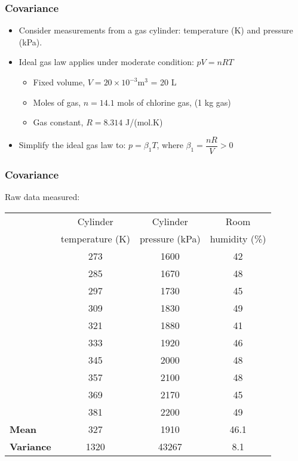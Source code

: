 \begin{frame}\frametitle{Covariance}
	\begin{itemize}
		\item	Consider measurements from a gas cylinder: temperature (K) and pressure (kPa).
		\item	Ideal gas law applies under moderate condition: $pV = nRT$
		\begin{itemize}
			\item	Fixed volume, $V = 20 \times 10^{-3} \text{m}^3$ = 20 L
			\item	Moles of gas, $n = 14.1$ mols of chlorine gas, (1 kg gas)
			\item	Gas constant, $R = 8.314$ J/(mol.K)
		\end{itemize}
	\end{itemize}
	\begin{itemize}
		\item	Simplify the ideal gas law to: $p=\beta_1 T$, where $\beta_1 = \dfrac{nR}{V} > 0$
	\end{itemize}
\end{frame}

\begin{frame}\frametitle{Covariance}

	Raw data measured:
	\begin{table}
		[ht] \centering
		\begin{tabular}
			{l c c c} \hline\hline &Cylinder & Cylinder & Room \\
			[0.5ex] &temperature (K) & pressure (kPa) & humidity (\%) \\
			[0.5ex] \hline & 273& 1600& 42\\
			& 285& 1670& 48\\
			& 297& 1730& 45\\
			& 309& 1830& 49\\
			& 321& 1880& 41\\
			& 333& 1920& 46\\
			& 345& 2000& 48\\
			& 357& 2100& 48\\
			& 369& 2170& 45\\
			& 381& 2200& 49\\
			\hline \textbf{Mean}& 327& 1910& 46.1\\
			\textbf{Variance} & 1320 & 43267 & 8.1\\
			\hline
		\end{tabular}
	\end{table}
\end{frame}

